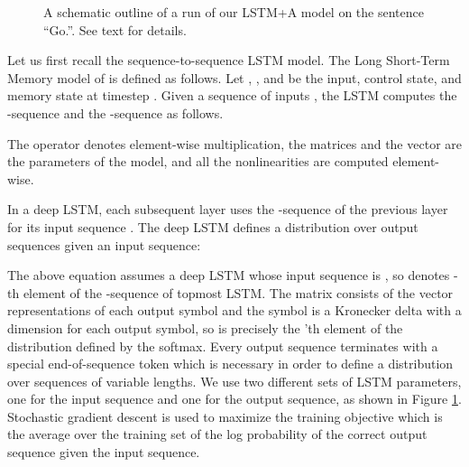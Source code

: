 \documentclass{article} \usepackage{nips15submit_e,times}
\newcommand\citet\cite
\begin{document}
\begin{figure}
\begin{center}
\end{center}
\caption{\small A schematic outline of a run of our LSTM+A model on
the sentence ``Go.''. See text for details.}
\label{fig:model}
\end{figure}

Let us first recall the sequence-to-sequence LSTM model.
The Long Short-Term Memory model of \citet{hochreiter1997}
is defined as follows.  Let , , and  be the input, control
state, and memory state at timestep .
Given a sequence of inputs , the LSTM computes
the -sequence  and
the -sequence  as follows.

The operator  denotes element-wise multiplication,
the matrices  and the vector  are the parameters
of the model, and all the nonlinearities are computed element-wise.

In a deep LSTM, each subsequent layer uses the -sequence of the previous
layer for its input sequence . The deep LSTM defines a distribution over
output sequences given an input sequence:

The above equation assumes a deep LSTM whose input sequence is
, so  denotes -th element
of the -sequence of topmost LSTM.
The matrix  consists of the vector representations of
each output symbol and the symbol  is a Kronecker
delta with a dimension for each output symbol,
so  is precisely
the 'th element of the distribution defined by the softmax.
Every output sequence terminates with a special end-of-sequence token which is
necessary in order to define a distribution over sequences of variable lengths.
We use two different sets of LSTM parameters, one for the input sequence and
one for the output sequence, as shown in Figure \ref{fig:model}.
Stochastic gradient descent is used to maximize the training objective
which is the average over the training set of the log probability
of the correct output sequence given the input sequence.
\end{document}
